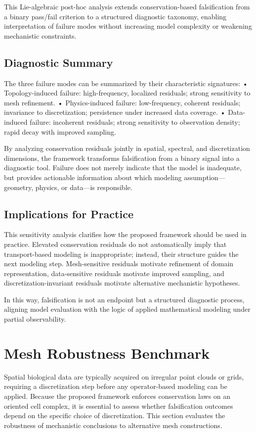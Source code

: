 \documentclass[10pt,article]{article}
\begin{document}
This Lie-algebraic post-hoc analysis extends conservation-based falsification from a binary pass/fail criterion to a structured diagnostic taxonomy, enabling interpretation of failure modes without increasing model complexity or weakening mechanistic constraints.

\subsection{Diagnostic Summary}

The three failure modes can be summarized by their characteristic signatures:
	•	Topology-induced failure: high-frequency, localized residuals; strong sensitivity to mesh refinement.
	•	Physics-induced failure: low-frequency, coherent residuals; invariance to discretization; persistence under increased data coverage.
	•	Data-induced failure: incoherent residuals; strong sensitivity to observation density; rapid decay with improved sampling.

By analyzing conservation residuals jointly in spatial, spectral, and discretization dimensions, the framework transforms falsification from a binary signal into a diagnostic tool. Failure does not merely indicate that the model is inadequate, but provides actionable information about which modeling assumption—geometry, physics, or data—is responsible.


\subsection{Implications for Practice}

This sensitivity analysis clarifies how the proposed framework should be used in practice. Elevated conservation residuals do not automatically imply that transport-based modeling is inappropriate; instead, their structure guides the next modeling step. Mesh-sensitive residuals motivate refinement of domain representation, data-sensitive residuals motivate improved sampling, and discretization-invariant residuals motivate alternative mechanistic hypotheses.

In this way, falsification is not an endpoint but a structured diagnostic process, aligning model evaluation with the logic of applied mathematical modeling under partial observability.


\section{Mesh Robustness Benchmark}
Spatial biological data are typically acquired on irregular point clouds or grids, requiring a discretization step before any operator-based modeling can be applied. Because the proposed framework enforces conservation laws on an oriented cell complex, it is essential to assess whether falsification outcomes depend on the specific choice of discretization. This section evaluates the robustness of mechanistic conclusions to alternative mesh constructions.
\end{document}
